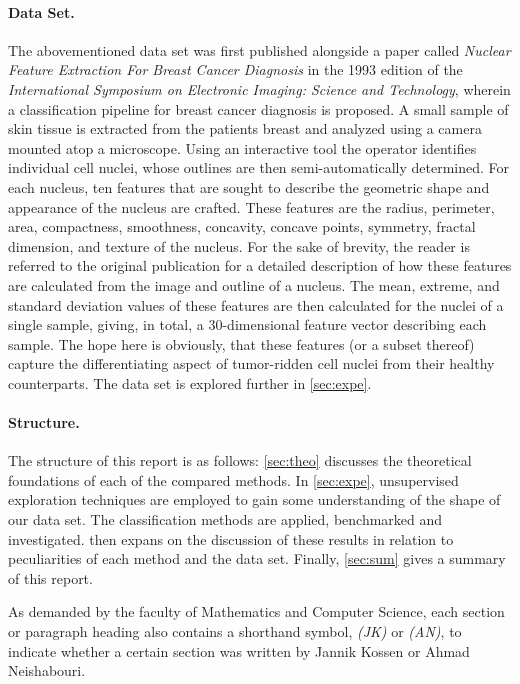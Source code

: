 \documentclass[12pt, a4paper]{scrartcl}
\begin{document}
\paragraph{Data Set.} The abovementioned data set was first published alongside a paper called \emph{Nuclear Feature Extraction For Breast Cancer Diagnosis} \cite{street1993nuclear} in the 1993 edition of the \emph{International Symposium on Electronic Imaging: Science and Technology}, wherein a classification pipeline for breast cancer diagnosis is proposed. A small sample of skin tissue is extracted from the patients breast and analyzed using a camera mounted atop a microscope. Using an interactive tool the operator identifies individual cell nuclei, whose outlines are then semi-automatically determined. For each nucleus, ten features that are sought to describe the geometric shape and appearance of the nucleus are crafted. These features are the radius, perimeter, area, compactness, smoothness, concavity, concave points, symmetry, fractal dimension, and texture of the nucleus.
For the sake of brevity, the reader is referred to the original publication \cite{street1993nuclear} for a detailed description of how these features are calculated from the image and outline of a nucleus. 
The mean, extreme, and standard deviation values of these features are then calculated for the nuclei of a single sample, giving, in total, a 30-dimensional feature vector describing each sample.
The hope here is obviously, that these features (or a subset thereof) capture the differentiating aspect of tumor-ridden cell nuclei from their healthy counterparts. The data set is explored further in \cref{sec:expe}.

\paragraph{Structure.} The structure of this report is as follows: \cref{sec:theo} discusses the theoretical foundations of each of the compared methods. In \cref{sec:expe}, unsupervised exploration techniques are employed to gain some understanding of the shape of our data set. The classification methods are applied, benchmarked and investigated.  then expans on the discussion of these results in relation to peculiarities of each method and the data set. Finally, \cref{sec:sum} gives a summary of this report.

As demanded by the faculty of Mathematics and Computer Science, each section or paragraph heading also contains a shorthand symbol, \emph{(JK)} or \emph{(AN)}, to indicate whether a certain section was written by Jannik Kossen or Ahmad Neishabouri.
\end{document}
